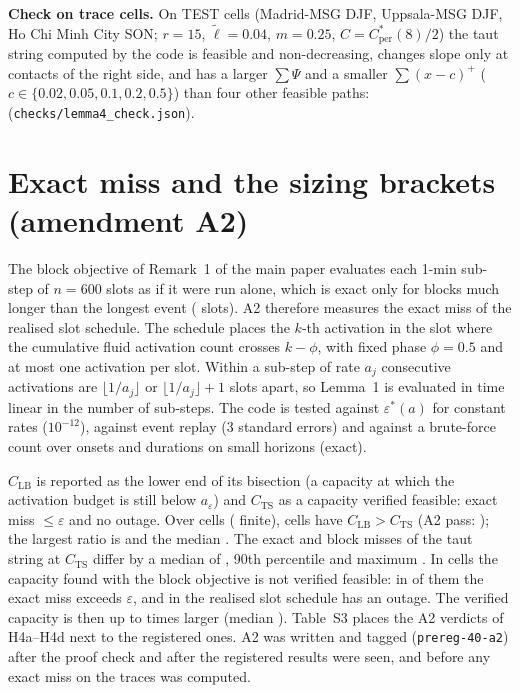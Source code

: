\documentclass[10pt]{article}
\newcommand{\eps}{\varepsilon}
\newcommand{\lt}{\tilde{\ell}}
\begin{document}
\textbf{Check on trace cells.} On \LfourN{} TEST cells (Madrid-MSG DJF, Uppsala-MSG DJF, Ho Chi Minh City SON; $r=15$, $\lt=0.04$, $m=0.25$, $C=C^*_{\mathrm{per}}(8)/2$) the taut string computed by the code is feasible and non-decreasing, changes slope only at contacts of the right side, and has a larger $\sum\Psi$ and a smaller $\sum(x-c)^+$ ($c\in\{0.02,0.05,0.1,0.2,0.5\}$) than four other feasible paths: \LfourOK{} (\texttt{checks/lemma4\_check.json}).

\section{Exact miss and the sizing brackets (amendment A2)}
The block objective of Remark~1 of the main paper evaluates each 1-min sub-step of $n=600$ slots as if it were run alone, which is exact only for blocks much longer than the longest event (\Dmax{} slots). A2 therefore measures the exact miss of the realised slot schedule. The schedule places the $k$-th activation in the slot where the cumulative fluid activation count crosses $k-\phi$, with fixed phase $\phi=0.5$ and at most one activation per slot. Within a sub-step of rate $a_j$ consecutive activations are $\lfloor1/a_j\rfloor$ or $\lfloor1/a_j\rfloor+1$ slots apart, so Lemma~1 is evaluated in time linear in the number of sub-steps. The code is tested against $\eps^*(a)$ for constant rates ($10^{-12}$), against event replay (3 standard errors) and against a brute-force count over onsets and durations on small horizons (exact).

$C_{\mathrm{LB}}$ is reported as the lower end of its bisection (a capacity at which the activation budget is still below $a_\eps$) and $C_{\mathrm{TS}}$ as a capacity verified feasible: exact miss $\le\eps$ and no outage. Over \AiiNcells{} cells (\AiiNfinite{} finite), \AiiNviol{} cells have $C_{\mathrm{LB}}>C_{\mathrm{TS}}$ (A2 pass: \AiiPass); the largest ratio is \AiiMaxLBTS{} and the median \AiiMedLBTS. The exact and block misses of the taut string at $C_{\mathrm{TS}}$ differ by a median of \AiiAbsMed{}, 90th percentile \AiiAbsPninety{} and maximum \AiiAbsMax. In \AiiNsurBad{} cells the capacity found with the block objective is not verified feasible: in \AiiNsurBadMiss{} of them the exact miss exceeds $\eps$, and in \AiiNsurBadOut{} the realised slot schedule has an outage. The verified capacity is then up to \AiiTSbadMax{} times larger (median \AiiTSbadMed). Table~S3 places the A2 verdicts of H4a--H4d next to the registered ones. A2 was written and tagged (\texttt{prereg-40-a2}) after the proof check and after the registered results were seen, and before any exact miss on the traces was computed.
\end{document}
